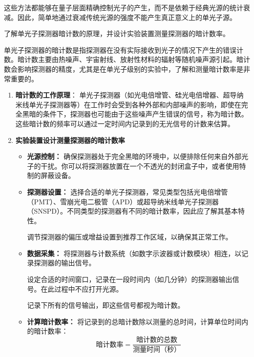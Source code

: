 \documentclass[dvipsnames, svgnames,a4paper,11pt]{article}
\begin{document}
	这些方法都能够在量子层面精确控制光子的产生，而不是依赖于经典光源的统计衰减。因此，简单地通过衰减传统光源的强度不能产生真正意义上的单光子源。







\begin{question}
	了解单光子探测器暗计数的原理，并设计实验装置测量探测器的暗计数率。
\end{question}



	单光子探测器的暗计数是指探测器在没有实际接收到光子的情况下产生的错误计数。暗计数主要由热噪声、宇宙射线、放射性材料的辐射等随机噪声源引起。暗计数会影响探测器的精度，尤其是在单光子级别的实验中，了解和测量暗计数率是非常重要的。

	\begin{enumerate}
		\item \textbf{暗计数的工作原理}：
			单光子探测器（如光电倍增管、硅光电倍增器、超导纳米线单光子探测器等）在工作时会受到各种外部和内部噪声的影响，即使在完全黑暗的条件下，探测器也可能由于这些噪声产生错误的信号，称为暗计数。这些暗计数的频率可以通过一定时间内记录到的无光信号的计数来估算。

		\item \textbf{实验装置设计测量探测器的暗计数率}
			\begin{itemize}
				\item \textbf{光源控制：}
					确保探测器处于完全黑暗的环境中，以便排除任何来自外部光子的干扰。你可以将探测器放置在一个不透光的封闭盒子中，或者使用特制的屏蔽设备。

				\item \textbf{探测器设置：}
					选择合适的单光子探测器，常见类型包括光电倍增管（PMT）、雪崩光电二极管（APD）或超导纳米线单光子探测器（SNSPD）。不同类型的探测器有不同的暗计数率，因此应了解其基本特性。
					
					调节探测器的偏压或增益设置到推荐工作区域，以确保其正常工作。

				\item \textbf{数据采集：}
					将探测器与计数系统（如数字示波器或计数模块）相连，以记录探测器的输出信号。

					设定合适的时间窗口，记录在一段时间内（如几分钟）的探测器输出信号。在此过程中不应打开光源。

					记录下所有的信号输出，即这些信号都视为暗计数。

				\item \textbf{计算暗计数率：}
					将记录到的总暗计数除以测量的总时间，计算单位时间内的暗计数率：
					\[
						\text{暗计数率} = \frac{\text{暗计数的总数}}{\text{测量时间（秒）}}
					\]

			\end{itemize}
	\end{enumerate}
\end{document}
